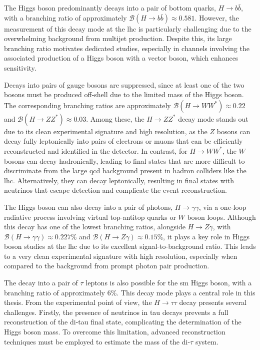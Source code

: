 The Higgs boson predominantly decays into a pair of bottom quarks, \( H \rightarrow b\bar{b} \), with a branching ratio of approximately \( \mathcal{B}(H \rightarrow b\bar{b}) \approx 0.581 \). However, the measurement of this decay mode at the \acrshort{lhc} is particularly challenging due to the overwhelming background from multijet production. Despite this, its large branching ratio motivates dedicated studies, especially in channels involving the associated production of a Higgs boson with a vector boson, which enhances sensitivity.

Decays into pairs of gauge bosons are suppressed, since at least one of the two bosons must be produced off-shell due to the limited mass of the Higgs boson. The corresponding branching ratios are approximately \( \mathcal{B}(H \rightarrow WW^*) \approx 0.22 \) and \( \mathcal{B}(H \rightarrow ZZ^*) \approx 0.03 \). Among these, the \( H \rightarrow ZZ^* \) decay mode stands out due to its clean experimental signature and high resolution, as the $Z$ bosons can decay fully leptonically into pairs of electrons or muons that can be efficiently reconstructed and identified in the detector. 
In contrast, for \( H \rightarrow WW^* \), the $W$ bosons can decay hadronically, leading to final states that are more difficult to discriminate from the large \acrshort{qcd} background present in hadron colliders like the \acrshort{lhc}. Alternatively, they can decay leptonically, resulting in final states with neutrinos that escape detection and complicate the event reconstruction.

The Higgs boson can also decay into a pair of photons, \( H \rightarrow \gamma\gamma \), via a one-loop radiative process involving virtual top-antitop quarks or $W$ boson loops. Although this decay has one of the lowest branching ratios, alongside \( H \rightarrow Z\gamma \), with \( \mathcal{B}(H \rightarrow \gamma\gamma) \approx 0.227\% \) and \( \mathcal{B}(H \rightarrow Z\gamma) \approx 0.15\% \), it plays a key role in Higgs boson studies at the \acrshort{lhc} due to its excellent signal-to-background ratio. This leads to a very clean experimental signature with high resolution, especially when compared to the background from prompt photon pair production.

The decay into a pair of $\tau$ leptons is also possible for the \acrshort{sm} Higgs boson, with a branching ratio of approximately 6\%. This decay mode plays a central role in this thesis. From the experimental point of view, the $H \rightarrow \tau\tau$ decay presents several challenges. Firstly, the presence of neutrinos in tau decays prevents a full reconstruction of the di-tau final state, complicating the determination of the Higgs boson mass. To overcome this limitation, advanced reconstruction techniques must be employed to estimate the mass of the di-$\tau$ system.

